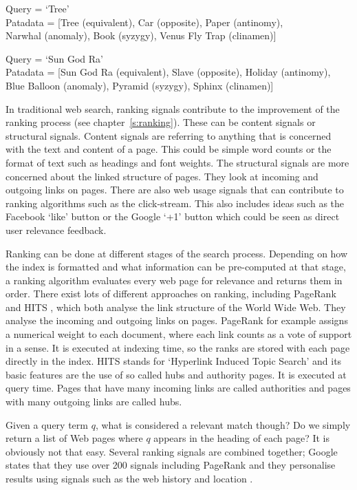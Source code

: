 Query      = `Tree'\\
Patadata = [Tree (equivalent),  Car (opposite), Paper (antinomy),\\ Narwhal (anomaly), Book (syzygy), Venus Fly Trap (clinamen)]

Query      = `Sun God Ra'\\
Patadata = [Sun God Ra (equivalent), Slave (opposite), Holiday (antinomy),\\ Blue Balloon (anomaly), Pyramid (syzygy), Sphinx (clinamen)]

\spirals

In traditional web search, ranking signals contribute to the improvement of the ranking process (see chapter~\ref{s:ranking}). These can be content signals or structural signals. Content signals are referring to anything that is concerned with the text and content of a page. This could be simple word counts or the format of text such as headings and font weights. The structural signals are more concerned about the linked structure of pages. They look at incoming and outgoing links on pages. There are also web usage signals that can contribute to ranking algorithms such as the click-stream. This also includes ideas such as the Facebook `like' button or the Google `+1' button which could be seen as direct user relevance feedback.

Ranking can be done at different stages of the search process. Depending on how the index is formatted and what information can be pre-computed at that stage, a ranking algorithm evaluates every web page for relevance and returns them in order. There exist lots of different approaches on ranking, including PageRank \autocite{Brin1998} and HITS \autocite{Kleinberg1999}, which both analyse the link structure of the World Wide Web. They analyse the incoming and outgoing links on pages. PageRank for example assigns a numerical weight to each document, where each link counts as a vote of support in a sense. It is executed at indexing time, so the ranks are stored with each page directly in the index. HITS stands for `Hyperlink Induced Topic Search' and its basic features are the use of so called hubs and authority pages. It is executed at query time. Pages that have many incoming links are called authorities and pages with many outgoing links are called hubs.

Given a query term $q$, what is considered a relevant match though? Do we simply return a list of Web pages where $q$ appears in the heading of each page? It is obviously not that easy. Several ranking signals are combined together; Google states that they use over \num{200} signals including PageRank and they personalise results using signals such as the web history and location \citeyear{Google2012}.

